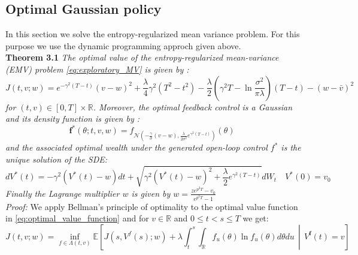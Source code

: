 \documentclass[oneside, a4paper, onecolumn, 11pt]{article}
\begin{document}
\subsection{Optimal Gaussian policy }
In this section we solve the entropy-regularized mean variance problem. For this purpose we use the dynamic programming approch given above.
\\\textbf{Theorem 3.1} \cite{WangZhou2020} \textit{The optimal value of the entropy-regularized mean-variance (EMV) problem \eqref{eq:exploratory_MV} is given by :}
\begin{equation}
J(t,v;w) = e^{-\gamma^2(T-t)}(v-w)^2 + \frac{\lambda}{4}\gamma^2 (T^2-t^2) - \frac{\lambda}{2} \left( \gamma^2T - \ln \frac{\sigma^2}{\pi \lambda} \right)(T-t) - (w- \bar{v})^2 
\end{equation}
\textit{for $(t,v) \in [0,T]\times \mathbb{R}$. 
Moreover, the optimal feedback control is a Gaussian and its density function is given by : 
\begin{equation}
   \boldsymbol{f}^*(\theta;t,v,w) = f_{\mathcal{N}\left(- \frac{\gamma}{\sigma}(v-w), \frac{\lambda}{2\sigma^2} e^{\gamma^2(T-t)} \right)}(\theta) \quad  
\end{equation}
and the associated optimal wealth under the generated open-loop control $f^*$ is the unique solution of the SDE: 
\begin{equation}
dV^*(t) = -\gamma^2(V^*(t) - w)dt + \sqrt{\gamma^2 \left(V^*(t) - w\right)^2 + \frac{\lambda}{2}e^{\gamma^2(T-t)}}dW_t \quad V^*(0) = v_0 
\end{equation}
Finally the Lagrange multiplier $w$ is given by $w = \frac{ze^{p^2T} - v_0 }{e^{p^2T}-1}$}\\ 
\textit{Proof:}
We apply Bellman's principle of optimality to the optimal value function in  \eqref{eq:optimal_value_function} and for $v\in \mathbb{R}$ and $0 \leq t <s \leq T$ we get: 
\[
J(t,v;w) = \inf_{f \in \Lambda(t,v)} \mathbb{E}\left[J(s, V^{f}(s); w) + \lambda \int_t^s \int_{\mathbb{R}} f_u(\theta) \ln f_u(\theta) d\theta du \,\middle|\, V^{\boldsymbol{f}}(t) = v\right]
\]
\end{document}
